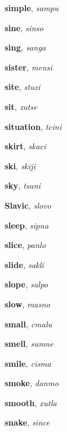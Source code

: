 \documentclass[12pt]{book}
\begin{document}
\begin{description}
\item[ ] \textbf{simple}, \textit{sampu}

\item[ ] \textbf{sine}, \textit{sinso}

\item[ ] \textbf{sing}, \textit{sanga}

\item[ ] \textbf{sister}, \textit{mensi}

\item[ ] \textbf{site}, \textit{stuzi}

\item[ ] \textbf{sit}, \textit{zutse}

\item[ ] \textbf{situation}, \textit{tcini}

\item[ ] \textbf{skirt}, \textit{skaci}

\item[ ] \textbf{ski}, \textit{skiji}

\item[ ] \textbf{sky}, \textit{tsani}

\item[ ] \textbf{Slavic}, \textit{slovo}

\item[ ] \textbf{sleep}, \textit{sipna}

\item[ ] \textbf{slice}, \textit{panlo}

\item[ ] \textbf{slide}, \textit{sakli}

\item[ ] \textbf{slope}, \textit{salpo}

\item[ ] \textbf{slow}, \textit{masno}

\item[ ] \textbf{small}, \textit{cmalu}

\item[ ] \textbf{smell}, \textit{sumne}

\item[ ] \textbf{smile}, \textit{cisma}

\item[ ] \textbf{smoke}, \textit{danmo}

\item[ ] \textbf{smooth}, \textit{xutla}

\item[ ] \textbf{snake}, \textit{since}


\end{description}
\end{document}

